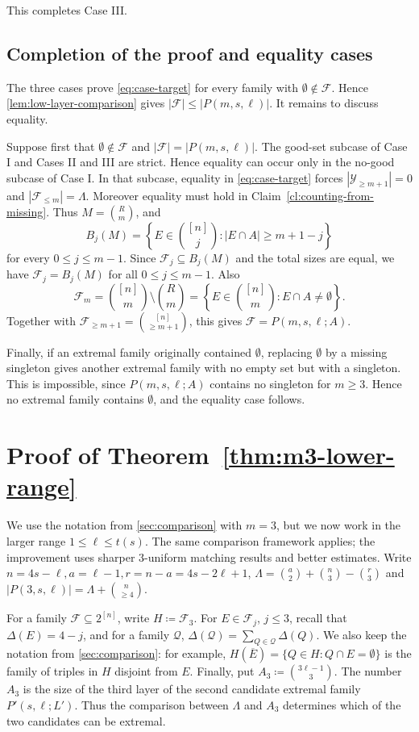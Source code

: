 \documentclass[10pt,a4paper]{article}
\numberwithin{equation}{section}
\theoremstyle{definition}
\newcommand{\F}{\mathcal F}
\newcommand{\Y}{\mathcal Y}
\begin{document}
This completes Case III.


\subsection{Completion of the proof and equality cases}

The three cases prove \eqref{eq:case-target} for every family with
\(\emptyset\notin\F\).  Hence \cref{lem:low-layer-comparison} gives
\(|\F|\le |P(m,s,\ell)|\).  It remains to discuss equality.

Suppose first that \(\emptyset\notin\F\) and
\(|\F|=|P(m,s,\ell)|\).  The good-set subcase of Case I and Cases II and
III are strict.  Hence equality can occur only in the no-good subcase of
Case I.  In that subcase, equality in \eqref{eq:case-target} forces $|\Y_{\ge m+1}|=0$ and $|\F_{\le m}|=\Lambda$.
Moreover equality must hold in Claim~\ref{cl:counting-from-missing}.  Thus
\(M=\binom Rm\), and
\[
    B_j(M)=
    \left\{E\in\binom{[n]}j: |E\cap A|\ge m+1-j\right\}
\]
for every \(0\le j\le m-1\).  Since \(\F_j\subseteq B_j(M)\) and the
total sizes are equal, we have \(\F_j=B_j(M)\) for all
\(0\le j\le m-1\).  Also
\[
    \F_m=\binom{[n]}m\setminus\binom Rm
    =
    \left\{E\in\binom{[n]}m:E\cap A\ne\emptyset\right\}.
\]
Together with \(\F_{\ge m+1}=\binom{[n]}{\ge m+1}\), this gives
\(\F=P(m,s,\ell;A).\)

Finally, if an extremal family originally contained \(\emptyset\), replacing
\(\emptyset\) by a missing singleton gives another extremal family with no
empty set but with a singleton.  This is impossible, since
\(P(m,s,\ell;A)\) contains no singleton for \(m\ge3\).  Hence no extremal
family contains \(\emptyset\), and the equality case follows.


\section{Proof of Theorem~\ref{thm:m3-lower-range}}\label{sec:m3-threshold}

We use the notation from \cref{sec:comparison} with $m=3$, but
we now work in the larger range $1\le \ell\le t(s)$.
The same comparison framework applies; the improvement uses sharper $3$-uniform matching results and better estimates.
Write $n=4s-\ell, a=\ell-1,r=n-a=4s-2\ell+1$, $\Lambda = \binom a2+\binom n3-\binom r3$ and $|P(3,s,\ell)|=\Lambda+\binom n{\ge4}$.

For a family \(\F\subseteq2^{[n]}\), write
\(H\coloneqq \F_3.\)
For \(E\in\F_j\), \(j\le3\), recall that \(\Delta(E)=4-j\), and for a family \(\mathcal Q\), \(\Delta(\mathcal Q)=\sum_{Q\in\mathcal Q}\Delta(Q)\).
We also keep the notation from \cref{sec:comparison}: for example,
\(H(\overline E)=\{Q\in H:Q\cap E=\emptyset\}\) is the family of triples in \(H\) disjoint from \(E\).
Finally, put
\(A_3\coloneqq \binom{3\ell-1}{3}.\)
The number $A_3$ is the size of the third layer of the second candidate
extremal family $P'(s,\ell;L')$.  Thus the comparison between $\Lambda$
and $A_3$ determines which of the two candidates can be extremal.
\end{document}
